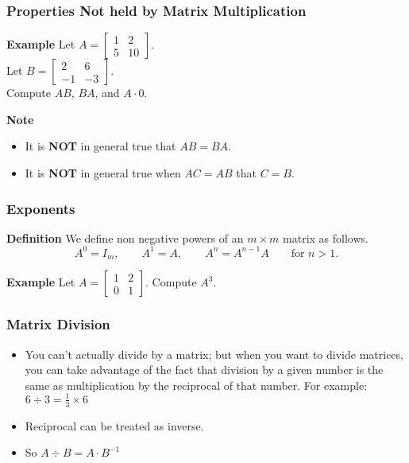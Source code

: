   \begin{frame}[fragile]\frametitle{Properties Not held by Matrix Multiplication}
\textbf{Example}
Let $A=\left[\begin{array}{rr} 1& 2 \\ 5 & 10 \end{array}\right]$.  \\ 
Let $B=\left[\begin{array}{rr}  2 & 6 \\ -1 & -3 \end{array}\right]$.   \\
Compute $AB$, $BA$, and $A\cdot 0$.



\textbf{Note}
\begin{itemize}
\item It is {\bf NOT} in general true that $AB=BA$.
\item It is {\bf NOT} in general true when $AC=AB$ that $C=B$.
\end{itemize}


\end{frame}

  \begin{frame}[fragile]\frametitle{Exponents}
\textbf{Definition}
We define non negative powers of an $m\times m$ matrix as follows. 
\begin{equation*}
A^0=I_m, \qquad A^1=A, \qquad A^n=A^{n-1}A \qquad\mbox{for $n>1$}.
\end{equation*}


\textbf{Example}
Let $A=\left[\begin{array}{rr} 1 & 2 \\ 0 & 1\end{array}\right]$.  Compute $A^3$.

\end{frame}


 \begin{frame}[fragile] \frametitle{Matrix Division}
\begin{itemize}
\item  You can't actually divide by a matrix; but when you want to divide matrices, you can take advantage of the fact that division by a given number is the same as multiplication by the reciprocal of that number. For example: $6 \div 3 = \frac{1}{3}\times 6$
\item Reciprocal can be treated as inverse.
\item So $A \div B = A \cdot B^{-1}$
\end{itemize}
\end{frame}


